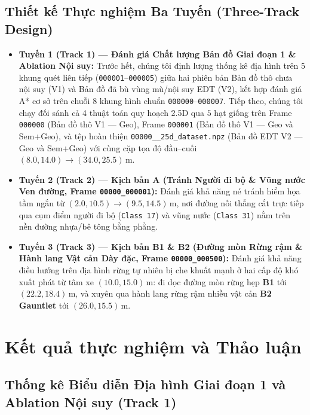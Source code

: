 \documentclass[a4paper,fleqn]{cas-sc}
\begin{document}
\subsection{Thiết kế Thực nghiệm Ba Tuyến (Three-Track Design)}
\begin{itemize}
    \item \textbf{Tuyến 1 (Track 1) — Đánh giá Chất lượng Bản đồ Giai đoạn 1 \& Ablation Nội suy:} Trước hết, chúng tôi định lượng thống kê địa hình trên 5 khung quét liên tiếp (\texttt{000001}--\texttt{000005}) giữa hai phiên bản Bản đồ thô chưa nội suy (V1) và Bản đồ đã bù vùng mù/nội suy EDT (V2), kết hợp đánh giá A* cơ sở trên chuỗi 8 khung hình chuẩn \texttt{000000}--\texttt{000007}. Tiếp theo, chúng tôi chạy đối sánh cả 4 thuật toán quy hoạch 2.5D qua $5$ hạt giống trên Frame \texttt{000000} (Bản đồ thô V1 — Geo), Frame \texttt{000001} (Bản đồ thô V1 — Geo và Sem+Geo), và tệp hoàn thiện \texttt{00000\_\_\allowbreak 25d\_\allowbreak dataset.npz} (Bản đồ EDT V2 — Geo và Sem+Geo) với cùng cặp tọa độ đầu--cuối $(8.0, 14.0) \to (34.0, 25.5)\,\text{m}$.
    \item \textbf{Tuyến 2 (Track 2) — Kịch bản A (Tránh Người đi bộ \& Vũng nước Ven đường, Frame \texttt{00000\_000001}):} Đánh giá khả năng né tránh hiểm họa tầm ngắn từ $(2.0, 10.5) \to (9.5, 14.5)\,\text{m}$, nơi đường nối thẳng cắt trực tiếp qua cụm điểm người đi bộ (\texttt{Class 17}) và vũng nước (\texttt{Class 31}) nằm trên nền đường nhựa/bê tông bằng phẳng.
    \item \textbf{Tuyến 3 (Track 3) — Kịch bản B1 \& B2 (Đường mòn Rừng rậm \& Hành lang Vật cản Dày đặc, Frame \texttt{00000\_000500}):} Đánh giá khả năng điều hướng trên địa hình rừng tự nhiên bị che khuất mạnh ở hai cấp độ khó xuất phát từ tâm xe $(10.0, 15.0)\,\text{m}$: đi dọc đường mòn rừng hẹp \textbf{B1} tới $(22.2, 18.4)\,\text{m}$, và xuyên qua hành lang rừng rậm nhiều vật cản \textbf{B2 Gauntlet} tới $(26.0, 15.5)\,\text{m}$.
\end{itemize}

\section{Kết quả thực nghiệm và Thảo luận}
\label{sec:results}

\subsection{Thống kê Biểu diễn Địa hình Giai đoạn 1 và Ablation Nội suy (Track 1)}
\label{subsec:res_track1}
\end{document}
